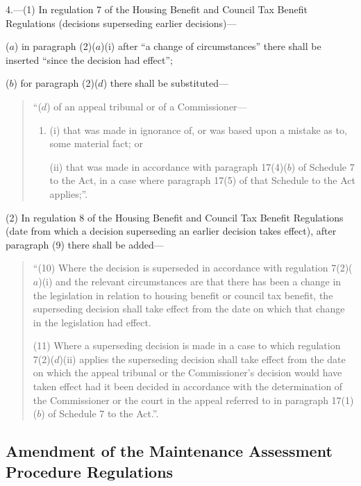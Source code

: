 \documentclass[12pt,a4paper]{article}
\begin{document}
4.---(1)  In regulation 7 of the Housing Benefit and Council Tax Benefit Regulations (decisions superseding earlier decisions)—

($a$) in paragraph (2)($a$)(i)  after “a change of circumstances” there shall be inserted “since the decision had effect”;

($b$) for paragraph (2)($d$)  there shall be substituted—
\begin{quotation}
“($d$) of an appeal tribunal or of a Commissioner—
\begin{enumerate}\item[]
(i) that was made in ignorance of, or was based upon a mistake as to, some material fact; or

(ii) that was made in accordance with paragraph 17(4)($b$)  of Schedule 7 to the Act, in a case where paragraph 17(5) of that Schedule to the Act applies;”.
\end{enumerate}
\end{quotation}

(2) In regulation 8 of the Housing Benefit and Council Tax Benefit Regulations (date from which a decision superseding an earlier decision takes effect), after paragraph (9) there shall be added—
\begin{quotation}
“(10) Where the decision is superseded in accordance with regulation 7(2)($a$)(i)  and the relevant circumstances are that there has been a change in the legislation in relation to housing benefit or council tax benefit, the superseding decision shall take effect from the date on which that change in the legislation had effect.

(11) Where a superseding decision is made in a case to which regulation 7(2)($d$)(ii)  applies the superseding decision shall take effect from the date on which the appeal tribunal or the Commissioner’s decision would have taken effect had it been decided in accordance with the determination of the Commissioner or the court in the appeal referred to in paragraph 17(1)($b$)  of Schedule 7 to the Act.”.
\end{quotation}

\subsection[5. Amendment of the Maintenance Assessment Procedure Regulations]{Amendment of the Maintenance Assessment Procedure Regulations}
\end{document}
